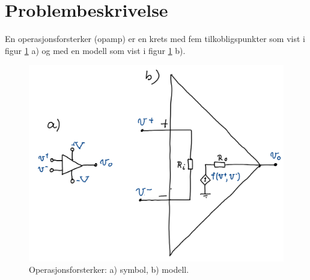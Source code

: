 \section{Problembeskrivelse}
\label{sec:issue}

En operasjonsforsterker (opamp) er en krets med fem tilkobligspunkter som vist i figur \ref{fig:01opamp} a)  og med en modell som vist i figur \ref{fig:01opamp} b).

\begin{figure}[!hbt]
	\centering
	\includegraphics[scale=0.5]{./Images/01Issue/01_opamp.png}
	\caption{Operasjonsforsterker: a) symbol, b) modell.}
	\label{fig:01opamp}
\end{figure}


